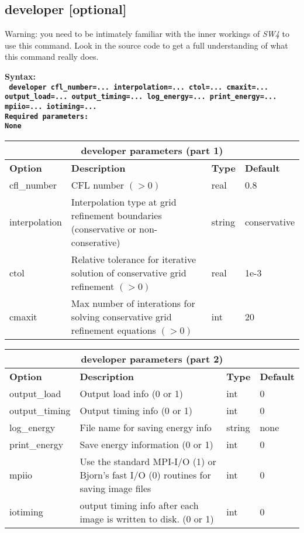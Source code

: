 \documentclass[11pt]{report}
\begin{document}
\subsection{developer [optional]}
\label{keyword:developer}
Warning: you need to be intimately familiar with the inner workings of \emph{SW4} to use this
command. Look in the source code to get a full understanding of what this command really does.

\begin{flushleft}\bf
Syntax:\\
\tt
developer
cfl\_number=... interpolation=... ctol=... cmaxit=... output\_load=... output\_timing=... log\_energy=... print\_energy=... mpiio=... iotiming=... \\
\bf Required parameters:\\
\rm
None
\end{flushleft}
\begin{center}
\begin{tabular}{|l|p{10cm}|l|l|} \hline
\multicolumn{4}{|c|}{\bf developer parameters (part 1)}\\ \hline
\bf{Option}   & \bf{Description} & \bf{Type} & \bf{Default} \\ \hline \hline
cfl\_number   & CFL number $(>0)$ & real &  0.8\\ \hline
interpolation & Interpolation type at grid refinement boundaries (conservative or non-conserative) &
string & conservative \\ \hline 
ctol          & Relative tolerance for iterative solution of conservative grid refinement $(>0)$ & real & 1e-3
\\ \hline
cmaxit        & Max number of interations for solving conservative grid refinement equations $(>0)$ & int & 20
\\ \hline
\end{tabular}
\end{center}
\begin{center}
\begin{tabular}{|l|p{10cm}|l|l|} \hline
\multicolumn{4}{|c|}{\bf developer parameters (part 2)}\\ \hline
\bf{Option}   & \bf{Description} & \bf{Type} & \bf{Default} \\ \hline \hline
output\_load  & Output load info (0 or 1) & int & 0 \\ \hline
output\_timing & Output timing info (0 or 1) & int & 0 \\ \hline
log\_energy   & File name for saving energy info & string & none \\ \hline
print\_energy & Save energy information (0 or 1) & int & 0 \\ \hline
mpiio         & Use the standard MPI-I/O (1) or Bjorn's fast I/O (0) routines for saving image files & int & 0 \\ \hline
iotiming      & output timing info after each image is written to disk. (0 or 1) & int & 0 \\ \hline
\end{tabular}
\end{center}
\end{document}
